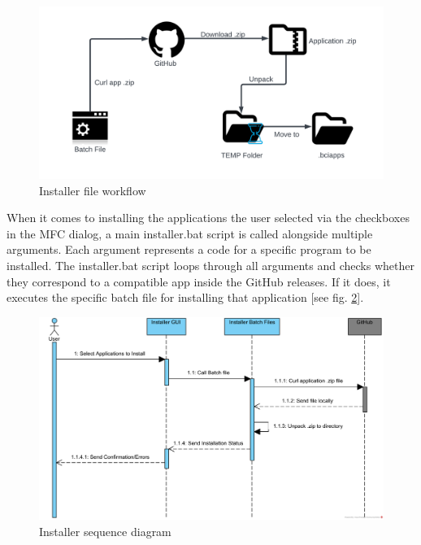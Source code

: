\begin{figure}[H]
  \centering
  \includegraphics[width=1\textwidth]{Diagrams/Installer Workflow.png}
  \caption{Installer file workflow}
  \label{fig:installer workflow}
\end{figure}


When it comes to installing the applications the user selected via the checkboxes in the MFC dialog, a main installer.bat script is called alongside multiple arguments. Each argument represents a code for a specific program to be installed. The installer.bat script loops through all arguments and checks whether they correspond to a compatible app inside the GitHub releases. If it does, it executes the specific batch file for installing that application [see fig. \ref{fig:installer sequence diagram}].

\begin{figure}[H]
  \centering
  \includegraphics[width=1\textwidth]{Diagrams/Sequence/Installer.png}
  \caption{Installer sequence diagram}
  \label{fig:installer sequence diagram}
\end{figure}

